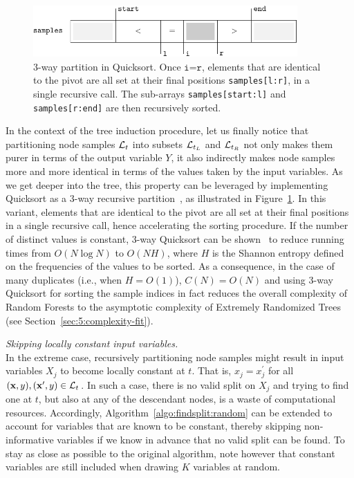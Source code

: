 \begin{description}
    \begin{figure}[b]
        \centering
        \includegraphics[width=0.9\textwidth]{figures/ch5_sort.pdf}
        \caption{3-way partition in Quicksort. Once $\texttt{i=r}$, elements that are identical
                 to the pivot are all set at their final positions \texttt{samples[l:r]}, in a single
                 recursive call. The sub-arrays \texttt{samples[start:l]} and \texttt{samples[r:end]}
                 are then recursively sorted.}
        \label{fig:5:sort}
    \end{figure}

    In the context of the tree induction procedure, let us finally notice that
    partitioning node samples ${\cal L}_t$ into subsets ${\cal L}_{t_L}$ and
    ${\cal L}_{t_R}$ not only makes them purer in terms of the output variable
    $Y$, it also indirectly makes node samples more and more identical in terms
    of the values taken by the input variables. As we get deeper into the tree,
    this property can be leveraged by implementing Quicksort as a 3-way
    recursive partition~\citep{bentley:1993}, as illustrated in
    Figure~\ref{fig:5:sort}. In this variant, elements that are identical to
    the pivot are all set at their final positions in a single recursive call,
    hence accelerating the sorting procedure. If the number of distinct values
    is constant, 3-way Quicksort can be shown~\citep{sedgewick:2011}
    to reduce running times from $O(N \log N)$ to $O(N H)$, where $H$ is the
    Shannon entropy defined on the frequencies of the values to be sorted. As a
    consequence, in the case of many duplicates (i.e., when $H=O(1)$),
    $C(N)=O(N)$ and using 3-way Quicksort for sorting the sample indices in
    fact reduces the overall complexity of Random Forests to the asymptotic
    complexity of Extremely Randomized Trees (see Section~\ref{sec:5:complexity-fit}).

\item \textit{Skipping locally constant input variables.}\hfill \\
    In the extreme case, recursively partitioning node samples might result in
    input variables $X_j$ to become locally constant at $t$. That is,
    $x_j=x^\prime_j$ for all $(\mathbf{x},y), (\mathbf{x}^\prime, y) \in {\cal
    L}_t$. In such  a case, there is no valid split on $X_j$ and trying to find
    one at $t$, but also at any of the descendant nodes, is a waste of
    computational resources. Accordingly, Algorithm~\ref{algo:findsplit:random}
    can be extended to account for variables that are known to be constant, thereby skipping
    non-informative variables if we know in advance that no valid split can be found.
    To stay as close as possible to the original algorithm, note however that constant
    variables are still included when drawing $K$ variables at random.


\end{description}
